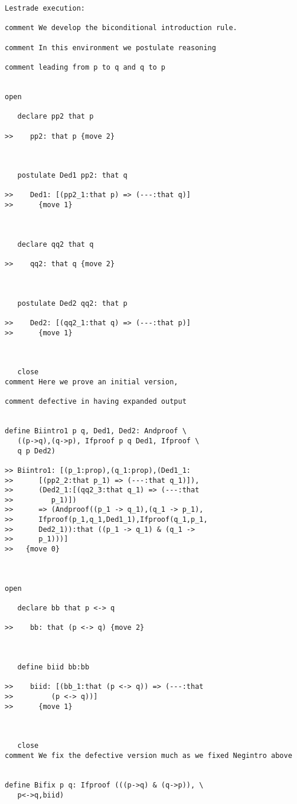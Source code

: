 \documentclass[12pt]{article}
\begin{document}
\begin{verbatim}Lestrade execution:

comment We develop the biconditional introduction rule.

comment In this environment we postulate reasoning

comment leading from p to q and q to p


open

   declare pp2 that p

>>    pp2: that p {move 2}



   postulate Ded1 pp2: that q

>>    Ded1: [(pp2_1:that p) => (---:that q)]
>>      {move 1}



   declare qq2 that q

>>    qq2: that q {move 2}



   postulate Ded2 qq2: that p

>>    Ded2: [(qq2_1:that q) => (---:that p)]
>>      {move 1}



   close
comment Here we prove an initial version,

comment defective in having expanded output


define Biintro1 p q, Ded1, Ded2: Andproof \
   ((p->q),(q->p), Ifproof p q Ded1, Ifproof \
   q p Ded2)

>> Biintro1: [(p_1:prop),(q_1:prop),(Ded1_1:
>>      [(pp2_2:that p_1) => (---:that q_1)]),
>>      (Ded2_1:[(qq2_3:that q_1) => (---:that
>>         p_1)])
>>      => (Andproof((p_1 -> q_1),(q_1 -> p_1),
>>      Ifproof(p_1,q_1,Ded1_1),Ifproof(q_1,p_1,
>>      Ded2_1)):that ((p_1 -> q_1) & (q_1 ->
>>      p_1)))]
>>   {move 0}



open

   declare bb that p <-> q

>>    bb: that (p <-> q) {move 2}



   define biid bb:bb

>>    biid: [(bb_1:that (p <-> q)) => (---:that
>>         (p <-> q))]
>>      {move 1}



   close
comment We fix the defective version much as we fixed Negintro above


define Bifix p q: Ifproof (((p->q) & (q->p)), \
   p<->q,biid)


\end{verbatim}
\end{document}
